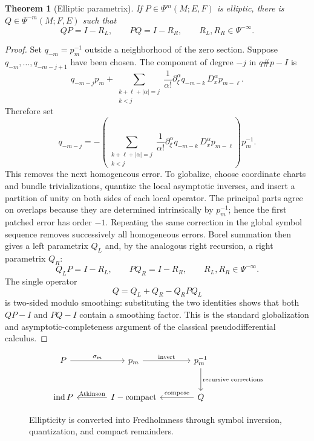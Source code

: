 \documentclass[11pt,oneside,reqno]{book}
\theoremstyle{plain}
\newtheorem{theorem}{Theorem}[chapter]
\theoremstyle{definition}
\theoremstyle{remark}
\begin{document}
\begin{theorem}[Elliptic parametrix]
If \(P\in\Psi^m(M;E,F)\) is elliptic, there is
\(Q\in\Psi^{-m}(M;F,E)\) such that
\[
 QP=I-R_L,\qquad PQ=I-R_R,
 \qquad R_L,R_R\in\Psi^{-\infty}.
\]
\end{theorem}

\begin{proof}
Set \(q_{-m}=p_m^{-1}\) outside a neighborhood of the zero section.
Suppose \(q_{-m},\ldots,q_{-m-j+1}\) have been chosen. The component of
degree \(-j\) in \(q\# p-I\) is
\[
 q_{-m-j}p_m+
 \sum_{\substack{k+\ell+|\alpha|=j\\k<j}}
 \frac1{\alpha!}
 \partial_\xi^\alpha q_{-m-k}\,D_x^\alpha p_{m-\ell}.
\]
Therefore set
\[
 q_{-m-j}
 =
 -\left(
 \sum_{\substack{k+\ell+|\alpha|=j\\k<j}}
 \frac1{\alpha!}
 \partial_\xi^\alpha q_{-m-k}\,D_x^\alpha p_{m-\ell}
 \right)p_m^{-1}.
\]
This removes the next homogeneous error.  To globalize, choose coordinate
charts and bundle trivializations, quantize the local asymptotic inverses,
and insert a partition of unity on both sides of each local operator.  The
principal parts agree on overlaps because they are determined intrinsically
by \(p_m^{-1}\); hence the first patched error has order \(-1\).  Repeating
the same correction in the global symbol sequence removes successively all
homogeneous errors.  Borel summation then gives a left parametrix
\(Q_L\) and, by the analogous right recursion, a right parametrix \(Q_R\):
\[
 Q_LP=I-R_L,\qquad PQ_R=I-R_R,\qquad R_L,R_R\in\Psi^{-\infty}.
\]
The single operator
\[
 Q=Q_L+Q_R-Q_RPQ_L
\]
is two-sided modulo smoothing: substituting the two identities shows that
both \(QP-I\) and \(PQ-I\) contain a smoothing factor.  This is the
standard globalization and asymptotic-completeness argument of the
classical pseudodifferential calculus.
\end{proof}

\begin{figure}[htbp]
\centering
\[
\begin{tikzcd}[column sep=large,row sep=large]
 P
 \arrow[r,"\sigma_m"]
 &p_m
 \arrow[r,"\text{invert}"]
 &p_m^{-1}
 \arrow[d,"\text{recursive corrections}"]\\
 \operatorname{ind}P
 &I-\text{compact}\arrow[l,"\text{Atkinson}"']
 &Q\arrow[l,"\text{compose}"']
\end{tikzcd}
\]
\caption[From elliptic symbol to Fredholm operator]{Ellipticity is converted into Fredholmness through symbol
inversion, quantization, and compact remainders.}
\end{figure}
\end{document}

